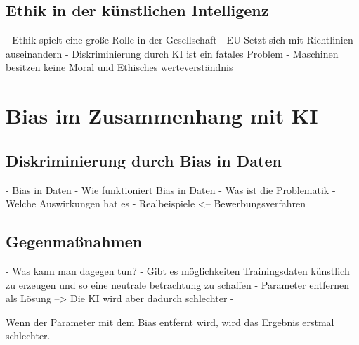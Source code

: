 \begin{onehalfspace}
    \subsection{Ethik in der künstlichen Intelligenz}
    \label{subsubsec:ethikinderKI}
        - Ethik spielt eine große Rolle in der Gesellschaft
        - EU Setzt sich mit Richtlinien auseinandern
        - Diskriminierung durch KI ist ein fatales Problem
        - Maschinen besitzen keine Moral und Ethisches werteverständnis


    \newpage
    \section{Bias im Zusammenhang mit \ac{KI}}
    \label{subsec:KIundbias}
    \subsection{Diskriminierung durch Bias in Daten}
    \label{subsubsec:diskriminierungdurchverzerrung}
        - Bias in Daten
        - Wie funktioniert Bias in Daten
        - Was ist die Problematik
        - Welche Auswirkungen hat es 
        - Realbeispiele <-- Bewerbungsverfahren

    \subsection{Gegenma{\ss}nahmen}
    \label{subsubsec:gegenmassnahmen}
        - Was kann man dagegen tun?
        - Gibt es möglichkeiten Trainingsdaten künstlich zu erzeugen und so eine neutrale betrachtung zu schaffen
        - Parameter entfernen als Lösung --> Die KI wird aber dadurch schlechter 
        - 

        Wenn der Parameter mit dem Bias entfernt wird, wird das Ergebnis erstmal schlechter. 
        
    \newpage
\end{onehalfspace}